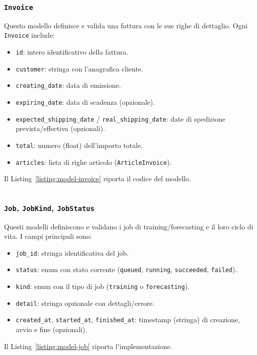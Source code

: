 \subsubsection{\texttt{Invoice}}
Questo modello definisce e valida una fattura con le sue righe di dettaglio. Ogni \texttt{Invoice} include:
\begin{itemize}
    \item \texttt{id}: intero identificativo della fattura.
    \item \texttt{customer}: stringa con l’anagrafica cliente.
    \item \texttt{creating\_date}: data di emissione.
    \item \texttt{expiring\_date}: data di scadenza (opzionale).
    \item \texttt{expected\_shipping\_date} / \texttt{real\_shipping\_date}: date di spedizione prevista/effectiva (opzionali).
    \item \texttt{total}: numero (float) dell’importo totale.
    \item \texttt{articles}: lista di righe articolo (\texttt{ArticleInvoice}).
\end{itemize}
Il Listing~\ref{listing:model-invoice} riporta il codice del modello.
\begin{listing}[H]
\inputminted[fontsize=\small, breaklines, breakanywhere=true, linenos=true, bgcolor=gray!10]{python}{code/models/invoice.py}
\caption{Modello Pydantic \texttt{Invoice}.}
\label{listing:model-invoice}
\end{listing}

\subsubsection{\texttt{Job}, \texttt{JobKind}, \texttt{JobStatus}}
Questi modelli definiscono e validano i job di training/forecasting e il loro ciclo di vita. I campi principali sono:
\begin{itemize}
    \item \texttt{job\_id}: stringa identificativa del job.
    \item \texttt{status}: enum con stato corrente (\texttt{queued}, \texttt{running}, \texttt{succeeded}, \texttt{failed}).
    \item \texttt{kind}: enum con il tipo di job (\texttt{training} o \texttt{forecasting}).
    \item \texttt{detail}: stringa opzionale con dettagli/errore.
    \item \texttt{created\_at}, \texttt{started\_at}, \texttt{finished\_at}: timestamp (stringa) di creazione, avvio e fine (opzionali).
\end{itemize}
Il Listing~\ref{listing:model-job} riporta l’implementazione.
\begin{listing}[H]
\inputminted[fontsize=\small, breaklines, breakanywhere=true, linenos=true, bgcolor=gray!10]{python}{code/models/job.py}
\caption{Modelli Pydantic \texttt{Job}/\texttt{JobKind}/\texttt{JobStatus}.}
\label{listing:model-job}
\end{listing}

